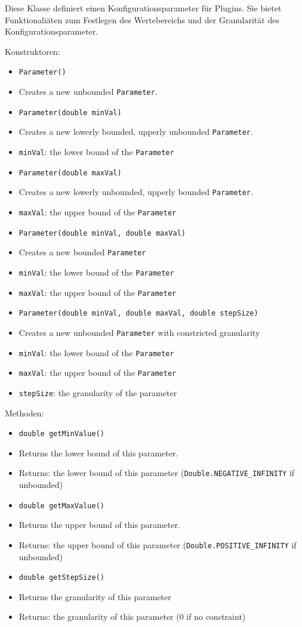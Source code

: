 \documentclass[parskip=full,11pt]{scrartcl}
\begin{document}
Diese Klasse definiert einen Konfigurationsparameter für Plugins. Sie bietet Funktionaliäten zum Festlegen des Wertebereichs und der Granularität des Konfigurationsparameter.

Konstruktoren:
\begin{itemize}\itemsep -10pt
	\item \texttt{Parameter()}
	\item[] Creates a new unbounded \texttt{Parameter}.
	
	\item \texttt{Parameter(double minVal)}
	\item[] Creates a new lowerly bounded, upperly unbounded \texttt{Parameter}.
	\item[] \texttt{minVal}: the lower bound of the \texttt{Parameter}
	\item \texttt{Parameter(double maxVal)}
	\item[] Creates a new lowerly unbounded, upperly bounded \texttt{Parameter}.
	\item[] \texttt{maxVal}: the upper bound of the \texttt{Parameter}
	\item \texttt{Parameter(double minVal, double maxVal)}
	\item[] Creates a new bounded \texttt{Parameter}
	\item[] \texttt{minVal}: the lower bound of the \texttt{Parameter}
	\item[] \texttt{maxVal}: the upper bound of the \texttt{Parameter}
	\item \texttt{Parameter(double minVal, double maxVal, double stepSize)}
	\item[] Creates a new unbounded \texttt{Parameter} with constricted granularity
\item[] \texttt{minVal}: the lower bound of the \texttt{Parameter}
	\item[] \texttt{maxVal}: the upper bound of the \texttt{Parameter}
	\item[] \texttt{stepSize}: the granularity of the parameter
	
\end{itemize}

Methoden:

\begin{itemize}\itemsep -10pt
	\item \texttt{double getMinValue()}
	\item[] Returns the lower bound of this parameter.
	\item[] Returns: the lower bound of this parameter (\texttt{Double.NEGATIVE\_INFINITY} if unbounded)
	\item \texttt{double getMaxValue()}
	\item[] Returns the upper bound of this parameter.
	\item[] Returns: the upper bound of this parameter (\texttt{Double.POSITIVE\_INFINITY} if unbounded)
	\item \texttt{double getStepSize()}
	\item[] Returns the granularity of this parameter
	\item[]Returns: the granularity of this parameter (\(0\) if no constraint)
\end{itemize}
\end{document}
